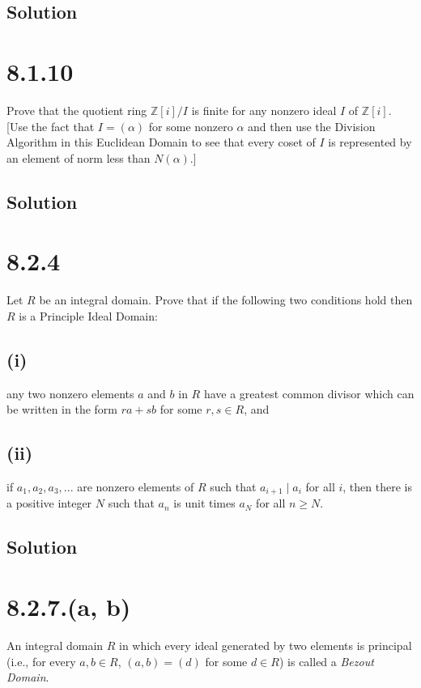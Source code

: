 \documentclass[fleqn]{article}
\begin{document}
        \subsection{Solution}
        
    
    \section{8.1.10}
    Prove that the quotient ring $\mathbb{Z}[i]/I$ is finite for any nonzero ideal $I$ of $\mathbb{Z}[i]$.  [Use the fact that $I = (\alpha)$ for some nonzero $\alpha$ and then use the Division Algorithm in this Euclidean Domain to see that every coset of $I$ is represented by an element of norm less than $N(\alpha)$.]
        
        \subsection{Solution}
        
    
    \section{8.2.4}
    Let $R$ be an integral domain.  Prove that if the following two conditions hold then $R$ is a Principle Ideal Domain:
        
        \subsection{(i)}
        any two nonzero elements $a$ and $b$ in $R$ have a greatest common divisor which can be written in the form $ra + sb$ for some $r, s \in R$, and
        
        \subsection{(ii)}
        if $a_1, a_2, a_3, ...$ are nonzero elements of $R$ such that $a_{i + 1} \mid a_i$ for all $i$, then there is a positive integer $N$ such that $a_n$ is unit times $a_N$ for all $n \geq N$.
        
        \subsection{Solution}
        
    
    \section{8.2.7.(a, b)}
    An integral domain $R$ in which every ideal generated by two elements is principal (i.e., for every $a, b \in R$, $(a, b) = (d)$ for some $d \in R$) is called a \textit{Bezout Domain}.
        
\end{document}
